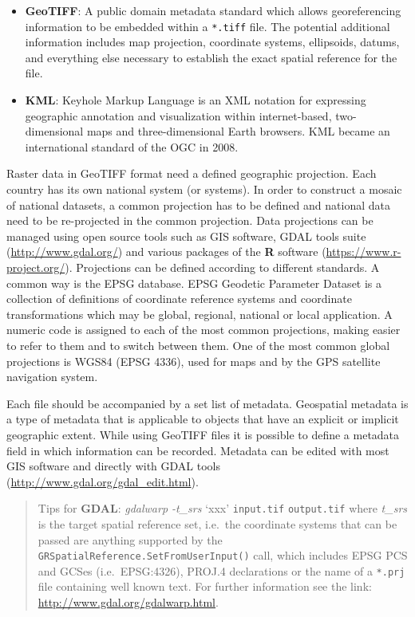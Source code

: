 \documentclass[10pt,b5paper,]{book}
\providecommand{\tightlist}{%
  \setlength{\itemsep}{0pt}\setlength{\parskip}{0pt}}
\theoremstyle{definition}
\theoremstyle{definition}
\theoremstyle{definition}
\theoremstyle{remark}
\begin{document}
\begin{itemize}
\tightlist
\item
  \textbf{GeoTIFF}: A public domain metadata standard which allows
  georeferencing information to be embedded within a \texttt{*.tiff}
  file. The potential additional information includes map projection,
  coordinate systems, ellipsoids, datums, and everything else necessary
  to establish the exact spatial reference for the file.
\item
  \textbf{KML}: Keyhole Markup Language is an XML notation for
  expressing geographic annotation and visualization within
  internet-based, two-dimensional maps and three-dimensional Earth
  browsers. KML became an international standard of the OGC in 2008.
\end{itemize}

Raster data in GeoTIFF format need a defined geographic projection. Each
country has its own national system (or systems). In order to construct
a mosaic of national datasets, a common projection has to be defined and
national data need to be re-projected in the common projection. Data
projections can be managed using open source tools such as GIS software,
GDAL tools suite (\url{http://www.gdal.org/}) and various packages of
the \textbf{R} software (\url{https://www.r-project.org/}). Projections
can be defined according to different standards. A common way is the
EPSG database. EPSG Geodetic Parameter Dataset is a collection of
definitions of coordinate reference systems and coordinate
transformations which may be global, regional, national or local
application. A numeric code is assigned to each of the most common
projections, making easier to refer to them and to switch between them.
One of the most common global projections is WGS84 (EPSG 4336), used for
maps and by the GPS satellite navigation system.

Each file should be accompanied by a set list of metadata. Geospatial
metadata is a type of metadata that is applicable to objects that have
an explicit or implicit geographic extent. While using GeoTIFF files it
is possible to define a metadata field in which information can be
recorded. Metadata can be edited with most GIS software and directly
with GDAL tools (\url{http://www.gdal.org/gdal_edit.html}).

\begin{quote}
Tips for \textbf{GDAL}: \emph{gdalwarp -t\_srs} `xxx' \texttt{input.tif}
\texttt{output.tif} where \emph{t\_srs} is the target spatial reference
set, i.e.~the coordinate systems that can be passed are anything
supported by the \texttt{GRSpatialReference.SetFromUserInput()} call,
which includes EPSG PCS and GCSes (i.e.~EPSG:4326), PROJ.4 declarations
or the name of a \texttt{*.prj} file containing well known text. For
further information see the link:
\url{http://www.gdal.org/gdalwarp.html}.
\end{quote}
\end{document}
